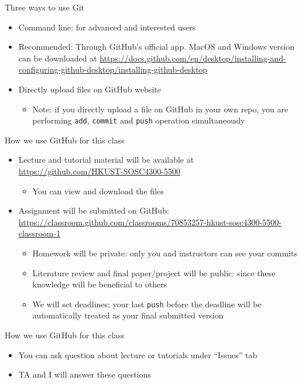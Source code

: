 \documentclass[handout]{beamer}
\begin{document}
\begin{frame}[fragile,label={h:d368594f-5260-4105-919a-dd1e64585794}]{Three ways to use Git}
 \begin{itemize}
\item Command line: for advanced and interested users
\item \alert{Recommended}: Through GitHub's official app. MacOS and Windows version can be downloaded at \url{https://docs.github.com/en/desktop/installing-and-configuring-github-desktop/installing-github-desktop}
\item Directly upload files on GitHub website
\begin{itemize}
\item Note: if you directly upload a file on GitHub in your own repo, you are performing \texttt{add}, \texttt{commit} and \texttt{push} operation simultaneously
\end{itemize}
\end{itemize}
\end{frame}

\begin{frame}[fragile,label={h:13964150-a838-47ec-901f-af8e0765bab4}]{How we use GitHub for this class}
 \begin{itemize}
\item Lecture and tutorial material will be available at \url{https://github.com/HKUST-SOSC4300-5500}
\begin{itemize}
\item You can view and download the files
\end{itemize}
\item Assignment will be submitted on GitHub: \url{https://classroom.github.com/classrooms/70853257-hkust-sosc4300-5500-classroom-1}
\begin{itemize}
\item Homework will be \alert{private}: only you and instructors can see your commits
\item Literature review and final paper/project will be \alert{public}: since these knowledge will be beneficial to others
\item We will set deadlines; your last \texttt{push} before the deadline will be automatically treated as your final submitted version
\end{itemize}
\end{itemize}
\end{frame}

\begin{frame}[label={h:d125ea27-89f2-4ba9-80ff-5f55fbd29f72}]{How we use GitHub for this class}
\begin{itemize}
\item You can ask question about lecture or tutorials under ``Issues'' tab
\item TA and I will answer these questions
\end{itemize}
\end{frame}
\end{document}
